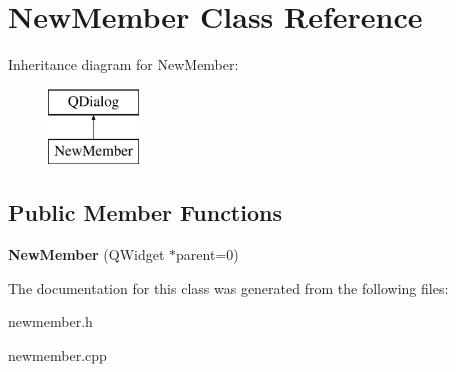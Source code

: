 \hypertarget{class_new_member}{}\section{New\+Member Class Reference}
\label{class_new_member}
Inheritance diagram for New\+Member\+:\begin{figure}[H]
\begin{center}
\leavevmode
\includegraphics[height=2.000000cm]{class_new_member}
\end{center}
\end{figure}
\subsection*{Public Member Functions}
\begin{DoxyCompactItemize}
\item 
{\bfseries New\+Member} (Q\+Widget $\ast$parent=0)\hypertarget{class_new_member_a52fd3cb75e8416209af01326c10a6d35}{}\label{class_new_member_a52fd3cb75e8416209af01326c10a6d35}

\end{DoxyCompactItemize}


The documentation for this class was generated from the following files\+:\begin{DoxyCompactItemize}
\item 
newmember.\+h\item 
newmember.\+cpp\end{DoxyCompactItemize}
